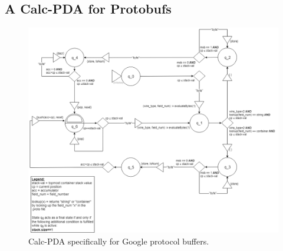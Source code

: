 \subsection{A Calc-PDA for Protobufs}
\label{4.6}
\begin{figure}
    \centering
    \includegraphics[width=\linewidth]{fig/Calc-protobuf-PDA-version-7-notitle.png}
    \caption{Calc-PDA specifically for Google protocol buffers.}
    \label{fig:fig-6-protobuf-Calc-pda-1}
\end{figure}
